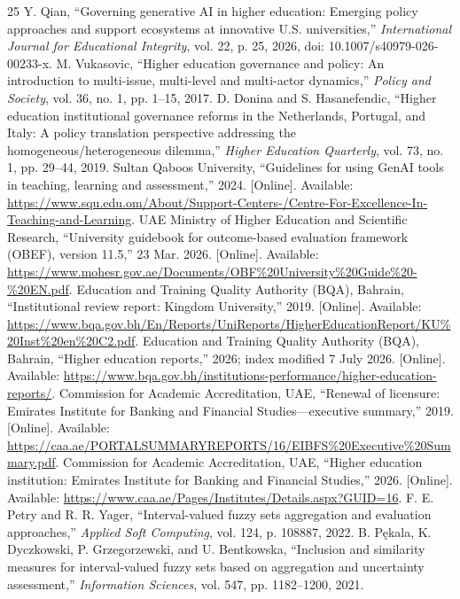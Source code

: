\documentclass[conference,letterpaper]{IEEEtran}
\begin{document}
\begin{thebibliography}{25}
 Y. Qian, ``Governing generative AI in higher education: Emerging policy approaches and support ecosystems at innovative U.S. universities,'' \emph{International Journal for Educational Integrity}, vol. 22, p. 25, 2026, doi: 10.1007/s40979-026-00233-x.
 M. Vukasovic, ``Higher education governance and policy: An introduction to multi-issue, multi-level and multi-actor dynamics,'' \emph{Policy and Society}, vol. 36, no. 1, pp. 1--15, 2017.
 D. Donina and S. Hasanefendic, ``Higher education institutional governance reforms in the Netherlands, Portugal, and Italy: A policy translation perspective addressing the homogeneous/heterogeneous dilemma,'' \emph{Higher Education Quarterly}, vol. 73, no. 1, pp. 29--44, 2019.
 Sultan Qaboos University, ``Guidelines for using GenAI tools in teaching, learning and assessment,'' 2024. [Online]. Available: \url{https://www.squ.edu.om/About/Support-Centers-/Centre-For-Excellence-In-Teaching-and-Learning}.
 UAE Ministry of Higher Education and Scientific Research, ``University guidebook for outcome-based evaluation framework (OBEF), version 11.5,'' 23 Mar. 2026. [Online]. Available: \url{https://www.mohesr.gov.ae/Documents/OBF%20University%20Guide%20-%20EN.pdf}.
 Education and Training Quality Authority (BQA), Bahrain, ``Institutional review report: Kingdom University,'' 2019. [Online]. Available: \url{https://www.bqa.gov.bh/En/Reports/UniReports/HigherEducationReport/KU%20Inst%20en%20C2.pdf}.
 Education and Training Quality Authority (BQA), Bahrain, ``Higher education reports,'' 2026; index modified 7 July 2026. [Online]. Available: \url{https://www.bqa.gov.bh/institutions-performance/higher-education-reports/}.
 Commission for Academic Accreditation, UAE, ``Renewal of licensure: Emirates Institute for Banking and Financial Studies---executive summary,'' 2019. [Online]. Available: \url{https://caa.ae/PORTALSUMMARYREPORTS/16/EIBFS%20Executive%20Summary.pdf}.
 Commission for Academic Accreditation, UAE, ``Higher education institution: Emirates Institute for Banking and Financial Studies,'' 2026. [Online]. Available: \url{https://www.caa.ae/Pages/Institutes/Details.aspx?GUID=16}.
 F. E. Petry and R. R. Yager, ``Interval-valued fuzzy sets aggregation and evaluation approaches,'' \emph{Applied Soft Computing}, vol. 124, p. 108887, 2022.
 B. P\k{e}kala, K. Dyczkowski, P. Grzegorzewski, and U. Bentkowska, ``Inclusion and similarity measures for interval-valued fuzzy sets based on aggregation and uncertainty assessment,'' \emph{Information Sciences}, vol. 547, pp. 1182--1200, 2021.

\end{thebibliography}
\end{document}
